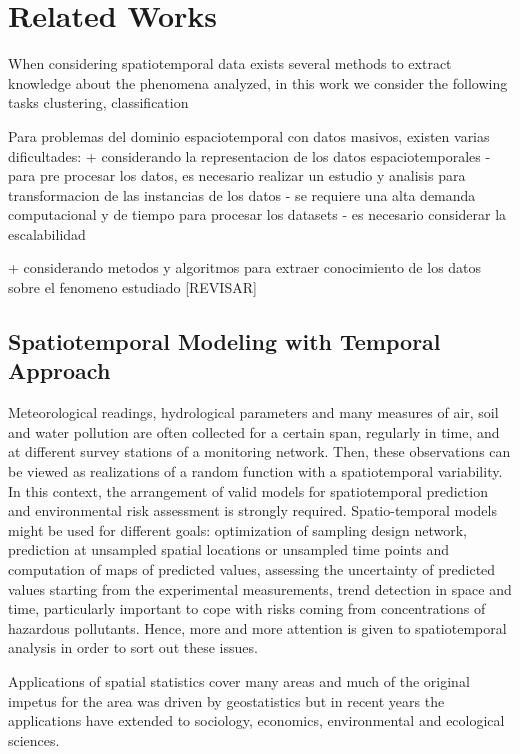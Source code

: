 \chapter{Related Works}
\label{chapter_Related_Works}

When considering spatiotemporal data exists several methods to extract knowledge about the phenomena analyzed, in this work we consider the following tasks clustering, classification

Para problemas del dominio espaciotemporal con datos masivos, existen varias dificultades: 
+ considerando la representacion de los datos espaciotemporales
	- para pre procesar los datos, es necesario realizar un estudio y analisis para transformacion de las instancias de los datos
	- se requiere una alta demanda computacional y de tiempo para procesar los datasets
	- es necesario considerar la escalabilidad 

+ considerando metodos y algoritmos para extraer conocimiento de los datos sobre el fenomeno estudiado [REVISAR]

\section{Spatiotemporal Modeling with Temporal Approach}
\label{Sec:SPT-Temporal}

Meteorological readings, hydrological parameters and many measures of air, soil and water pollution are often collected for a certain span, regularly in time, and at different survey stations of a monitoring network. Then, these observations can be viewed as realizations of a random function with a spatiotemporal variability. In this context, the arrangement of valid models for spatiotemporal prediction and environmental risk assessment is strongly required. Spatio-temporal models might be used for different goals: optimization of sampling design network, prediction at unsampled spatial locations or unsampled time points and computation of maps of predicted values, assessing the uncertainty of predicted values starting from the experimental measurements, trend detection in space and time, particularly important to cope with risks coming from concentrations of hazardous pollutants. Hence, more and more attention is given to spatiotemporal analysis in order to sort out these issues.

Applications of spatial statistics cover many areas and much of the original impetus for the area was driven by geostatistics but in recent years the applications have extended to sociology, economics, environmental and ecological sciences.

